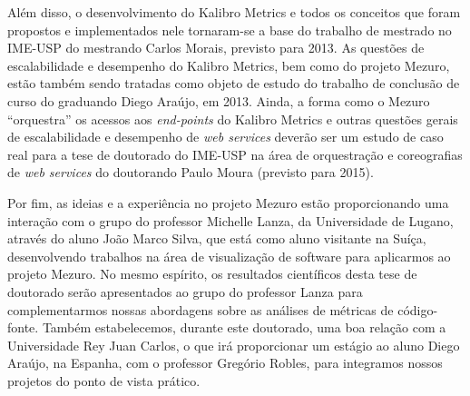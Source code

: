 Além disso, o desenvolvimento do Kalibro Metrics e todos os conceitos que foram propostos
e implementados nele tornaram-se a base do trabalho de mestrado no IME-USP do mestrando
 Carlos Morais, previsto para 2013.
%
As questões de escalabilidade e desempenho do Kalibro Metrics, bem
como do projeto Mezuro, estão também sendo tratadas como objeto de estudo do
trabalho de conclusão de curso do graduando Diego Araújo, em 2013.
%
Ainda, a forma como o Mezuro ``orquestra'' os acessos aos \textit{end-points} 
do Kalibro Metrics e outras questões gerais de escalabilidade e desempenho
de \textit{web services} deverão ser um estudo de caso real para
a tese de doutorado do IME-USP na área de orquestração e coreografias de 
\textit{web services} do doutorando Paulo Moura (previsto para 2015).

Por fim, as ideias e a experiência no projeto Mezuro estão proporcionando uma
interação com o grupo do professor Michelle Lanza, da Universidade de Lugano,
através do aluno João Marco Silva, que está como aluno visitante na Suíça,
desenvolvendo trabalhos na área de visualização de software para aplicarmos
ao projeto Mezuro. No mesmo espírito, os resultados científicos desta tese de doutorado
serão apresentados ao grupo do professor Lanza para complementarmos nossas
abordagens sobre as análises de métricas de código-fonte.
%
Também estabelecemos, durante este doutorado, uma boa relação com
a Universidade Rey Juan Carlos, o que irá proporcionar um estágio ao
aluno Diego Araújo, na Espanha, com o professor Gregório Robles, para integramos
nossos projetos do ponto de vista prático.

